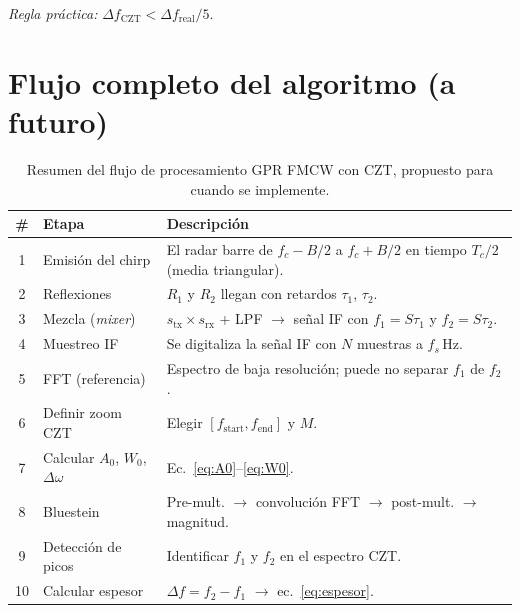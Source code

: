 \documentclass[12pt, a4paper, twoside]{report}
\begin{document}
\textit{Regla práctica:} $\Delta f_\text{CZT} < \Delta f_\text{real}/5$.

\section{Flujo completo del algoritmo (a futuro)}
\label{sec:flujo_czt}

\begin{table}[H]
  \centering
  \caption{Resumen del flujo de procesamiento GPR FMCW con CZT, propuesto para cuando se implemente.}
  \label{tab:flujo}
  \begin{tabular}{clp{7cm}}
    \toprule
    \textbf{\#} & \textbf{Etapa} & \textbf{Descripción} \\
    \midrule
    1 & Emisión del chirp
    & El radar barre de $f_c - B/2$ a $f_c + B/2$ en tiempo $T_c/2$
    (media triangular). \\
    2 & Reflexiones
    & $R_1$ y $R_2$ llegan con retardos $\tau_1$, $\tau_2$. \\
    3 & Mezcla (\textit{mixer})
    & $s_\text{tx}\times s_\text{rx}$ + LPF $\rightarrow$ señal IF con
    $f_1 = S\tau_1$ y $f_2 = S\tau_2$. \\
    4 & Muestreo IF
    & Se digitaliza la señal IF con $N$ muestras a $f_s\,\text{Hz}$. \\
    5 & FFT (referencia)
    & Espectro de baja resolución; puede no separar $f_1$ de $f_2$. \\
    6 & Definir zoom CZT
    & Elegir $[f_\text{start}, f_\text{end}]$ y $M$. \\
    7 & Calcular $A_0$, $W_0$, $\Delta\omega$
    & Ec.~\eqref{eq:A0}--\eqref{eq:W0}. \\
    8 & Bluestein
    & Pre-mult. $\to$ convolución FFT $\to$ post-mult. $\to$ magnitud. \\
    9 & Detección de picos
    & Identificar $f_1$ y $f_2$ en el espectro CZT. \\
    10 & Calcular espesor
    & $\Delta f = f_2 - f_1$ $\rightarrow$ ec.~\eqref{eq:espesor}. \\
    \bottomrule
  \end{tabular}
\end{table}

\printbibliography[heading=bibintoc, title={Referencias}]
\end{document}
